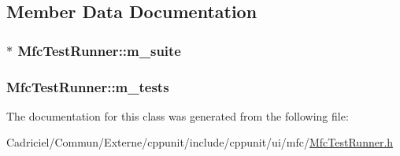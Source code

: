 \subsection{Member Data Documentation}
\hypertarget{class_mfc_test_runner_a7700f0b285e70f42f3e84b56be890658}{
\subsubsection[{m\-\_\-suite}]{$\ast$ Mfc\-Test\-Runner\-::m\-\_\-suite\hspace{0.3cm}{\ttfamily [protected]}}}\label{class_mfc_test_runner_a7700f0b285e70f42f3e84b56be890658}
\hypertarget{class_mfc_test_runner_a041d453efb2f9e262676f1d68f1c22af}{
\subsubsection[{m\-\_\-tests}]{ Mfc\-Test\-Runner\-::m\-\_\-tests\hspace{0.3cm}{\ttfamily [protected]}}}\label{class_mfc_test_runner_a041d453efb2f9e262676f1d68f1c22af}


The documentation for this class was generated from the following file\-:\begin{DoxyCompactItemize}
\item 
Cadriciel/\-Commun/\-Externe/cppunit/include/cppunit/ui/mfc/\hyperlink{_mfc_test_runner_8h}{Mfc\-Test\-Runner.\-h}\end{DoxyCompactItemize}
